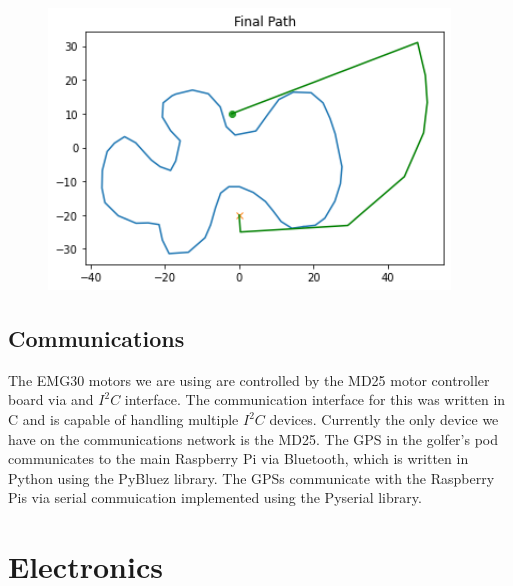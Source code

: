 \documentclass[11pt,landscape]{article}
\begin{document}
\begin{figure}[H]
\begin{mdframed}
\begin{center}
\begin{minipage}{0.3\textwidth}
            \end{minipage}
            \begin{minipage}{0.3\textwidth}
                \includegraphics[width=0.95\textwidth]{final.png}
            \end{minipage}
        \end{center}
    \end{mdframed}
    \label{fig:pathfinding_visual}
\end{figure}
\newpage

\begin{multicols}{3}

\subsection{Communications}
The EMG30 motors we are using are controlled by the MD25 motor controller board
via and $I^2C$ interface. The communication interface for this was written in C
and is capable of handling multiple $I^2C$ devices. Currently the only device we
have on the communications network is the MD25. The GPS in the golfer's pod communicates to the main Raspberry Pi via Bluetooth,
which is written in Python using the PyBluez library. The GPSs communicate with
the Raspberry Pis via serial commuication implemented using the Pyserial library.


\newpage
\section{Electronics}
\label{electronics}
\newpage
\nocite{*}


\end{multicols}
\end{document}
